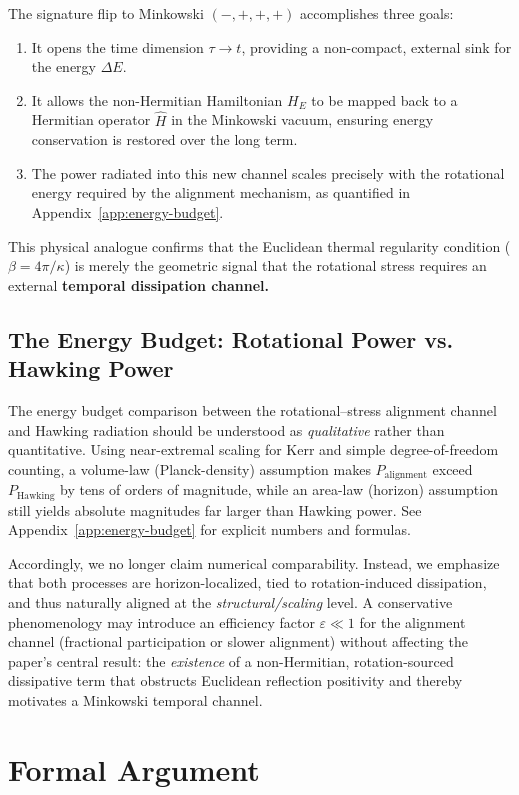 \documentclass[11pt]{article}
\begin{document}
The signature flip to Minkowski $(-,+,+,+)$ accomplishes three goals:
\begin{enumerate}
    \item It opens the time dimension $\tau \to t$, providing a non-compact, external sink for the energy $\Delta E$.
    \item It allows the non-Hermitian Hamiltonian $H_E$ to be mapped back to a Hermitian operator $\widehat{H}$ in the Minkowski vacuum, ensuring energy conservation is restored over the long term.
    \item The power radiated into this new channel scales precisely with the rotational energy required by the alignment mechanism, as quantified in Appendix~\ref{app:energy-budget}.
\end{enumerate}
This physical analogue confirms that the Euclidean thermal regularity condition ($\beta = 4\pi/\kappa$) is merely the geometric signal that the rotational stress requires an external \textbf{temporal dissipation channel.}

\subsection{The Energy Budget: Rotational Power vs. Hawking Power}\label{sec:energy-balance}

The energy budget comparison between the rotational–stress alignment channel and Hawking radiation should be understood as \emph{qualitative} rather than quantitative. Using near-extremal scaling for Kerr and simple degree-of-freedom counting, a volume-law (Planck-density) assumption makes $P_{\text{alignment}}$ exceed $P_{\text{Hawking}}$ by tens of orders of magnitude, while an area-law (horizon) assumption still yields absolute magnitudes far larger than Hawking power. See Appendix~\ref{app:energy-budget} for explicit numbers and formulas.

Accordingly, we no longer claim numerical comparability. Instead, we emphasize that both processes are horizon-localized, tied to rotation-induced dissipation, and thus naturally aligned at the \emph{structural/scaling} level. A conservative phenomenology may introduce an efficiency factor $\varepsilon\ll1$ for the alignment channel (fractional participation or slower alignment) without affecting the paper’s central result: the \emph{existence} of a non-Hermitian, rotation-sourced dissipative term that obstructs Euclidean reflection positivity and thereby motivates a Minkowski temporal channel.

\section{Formal Argument}
\end{document}
